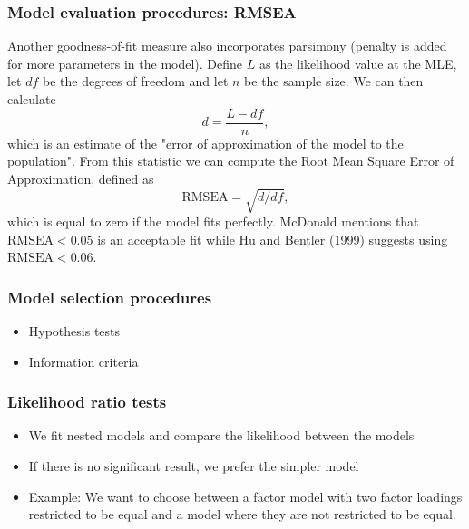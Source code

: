 \documentclass[compress]{beamer}
\begin{document}
\begin{frame}[fragile]
\frametitle{Model evaluation procedures: RMSEA}
Another goodness-of-fit measure also incorporates parsimony (penalty is added for more  parameters in the model). Define $L$ as the likelihood value at the MLE, let $df$ be the degrees of freedom and let $n$ be the sample size. We can then calculate
\[
d = \frac{L- df}{n},
\]
which is an estimate of the "error of approximation of the model to the population". From this statistic we can compute the Root Mean Square Error of Approximation, defined as
\[
\text{RMSEA} = \sqrt{d/df},
\]
which is equal to zero if the model fits perfectly. McDonald mentions that $\text{RMSEA} < 0.05$ is an acceptable fit while Hu and Bentler (1999) suggests using $\text{RMSEA} < 0.06$.
\end{frame}

\begin{frame}[fragile]
\frametitle{Model selection procedures}
\begin{itemize}
\item Hypothesis tests
\item Information criteria
\end{itemize}
\end{frame}

\begin{frame}[fragile]
\frametitle{Likelihood ratio tests}
\begin{itemize}
\item We fit nested models and compare the likelihood between the models
\item If there is no significant result, we prefer the simpler model
\item Example: We want to choose between a factor model with two factor loadings restricted to be equal and a model where they are not restricted to be equal.
\end{itemize}
\end{frame}
\end{document}
